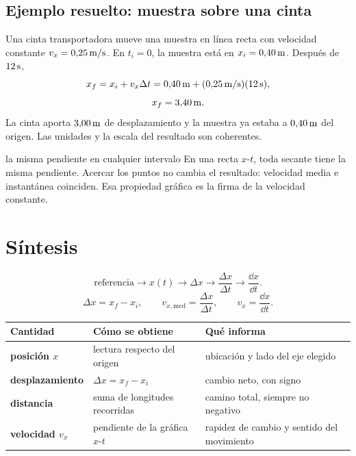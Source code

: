\documentclass[11pt]{article}
\begin{document}
\subsection{Ejemplo resuelto: muestra sobre una cinta}

Una cinta transportadora mueve una muestra en línea recta con velocidad
constante \(v_x=0{,}25\,\mathrm{m/s}\). En \(t_i=0\), la muestra está en
\(x_i=0{,}40\,\mathrm{m}\). Después de \(12\,\mathrm{s}\),
\[
  x_f
  =
  x_i+v_x\Delta t
  =
  0{,}40\,\mathrm{m}
  +(0{,}25\,\mathrm{m/s})(12\,\mathrm{s}),
\]
\[
  x_f=3{,}40\,\mathrm{m}.
\]
La cinta aporta \(3{,}00\,\mathrm{m}\) de desplazamiento y la muestra ya
estaba a \(0{,}40\,\mathrm{m}\) del origen. Las unidades y la escala del
resultado son coherentes.

\begin{ejemplocualitativo}{la misma pendiente en cualquier intervalo}
En una recta \(x\)-\(t\), toda secante tiene la misma pendiente. Acercar los
puntos no cambia el resultado: velocidad media e instantánea coinciden. Esa
propiedad gráfica es la firma de la velocidad constante.
\end{ejemplocualitativo}

\section{Síntesis}

\[
  \text{referencia}
  \longrightarrow
  x(t)
  \longrightarrow
  \Delta x
  \longrightarrow
  \frac{\Delta x}{\Delta t}
  \longrightarrow
  \frac{\dd x}{\dd t}.
\]
\[
  \Delta x=x_f-x_i,
  \qquad
  v_{x,\mathrm{med}}=\frac{\Delta x}{\Delta t},
  \qquad
  v_x=\frac{\dd x}{\dd t}.
\]

\begin{center}
\small
\begin{tabular}{@{}>{\bfseries}p{3.2cm}p{4.6cm}p{5.0cm}@{}}
\toprule
Cantidad & Cómo se obtiene & Qué informa \\
\midrule
posición \(x\) & lectura respecto del origen &
ubicación y lado del eje elegido \\
desplazamiento & \(\Delta x=x_f-x_i\) &
cambio neto, con signo \\
distancia & suma de longitudes recorridas &
camino total, siempre no negativo \\
velocidad \(v_x\) & pendiente de la gráfica \(x\)-\(t\) &
rapidez de cambio y sentido del movimiento \\
\bottomrule
\end{tabular}
\end{center}
\end{document}
